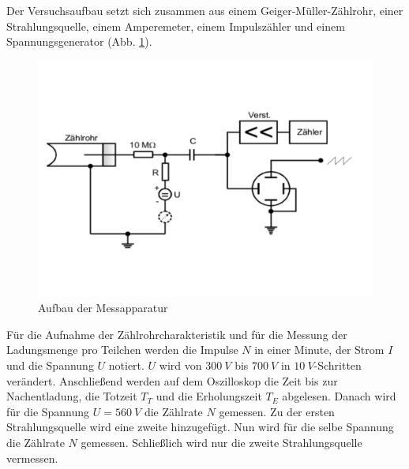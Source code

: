 Der Versuchsaufbau setzt sich zusammen aus einem Geiger-Müller-Zählrohr, einer Strahlungsquelle, einem Amperemeter, einem Impulszähler und einem Spannungsgenerator (Abb. \ref{fig:aufbau}).
\begin{figure}[h!]
  \centering
  \includegraphics[width=\textwidth]{703aufbau.pdf}
  \caption{Aufbau der Messapparatur \cite{1}}
  \label{fig:aufbau}
\end{figure}
Für die Aufnahme der Zählrohrcharakteristik und für die Messung der Ladungsmenge pro Teilchen werden die Impulse $N$ in einer Minute, der Strom $I$ und die Spannung $U$ notiert.
$U$ wird von $\SI{300}{V}$ bis $\SI{700}{V}$ in $\SI{10}{V}$-Schritten verändert.
Anschließend werden auf dem Oszilloskop die Zeit bis zur Nachentladung, die Totzeit $T_{T}$ und die Erholungszeit $T_{E}$ abgelesen.
Danach wird für die Spannung $U=\SI{560}{V}$ die Zählrate $N$ gemessen.
Zu der ersten Strahlungsquelle wird eine zweite hinzugefügt.
Nun wird für die selbe Spannung die Zählrate $N$ gemessen.
Schließlich wird nur die zweite Strahlungsquelle vermessen.
